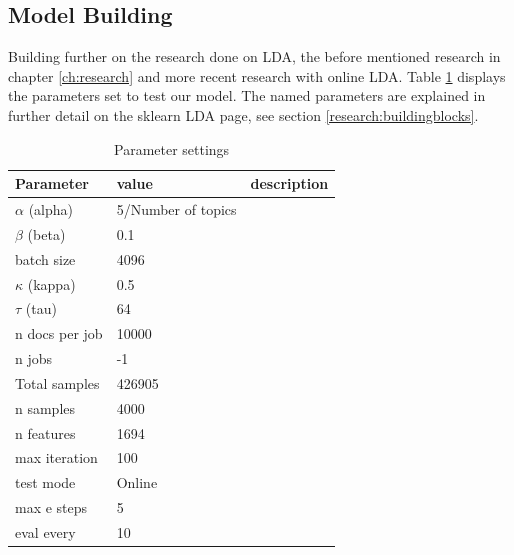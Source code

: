 \subsection{Model Building} \label{methodology:model_building}
Building further on the research done on LDA, the before mentioned research in chapter \ref{ch:research} and more recent research with online LDA. Table \ref{tab:tableparset} displays the parameters set to test our model. The named parameters are explained in further detail on the sklearn LDA page, see section \ref{research:buildingblocks}. 

\begin{table}[h]
\centering
 \begin{tabular}{|l|l| l|} 
 \hline
 Parameter & value & description \\ 
 \hline
 \hline
 $\alpha$ (alpha) & 5/Number of topics & \\ 
 $\beta$ (beta) & 0.1 &\\
 batch size  & 4096 &\\
 $\kappa$ (kappa) & 0.5 &\\
 $\tau$ (tau) & 64 &\\
 n docs per job & 10000&\\
 n jobs & -1 &\\
 Total samples & 426905&\\
 n samples & 4000 &\\
 n features & 1694 & \\
 max iteration & 100 &\\
 test mode & Online &\\
 max e steps & 5 &\\
 eval every & 10 &\\
 \hline
 \end{tabular}
\caption{Parameter settings}
\label{tab:tableparset}
\end{table}

